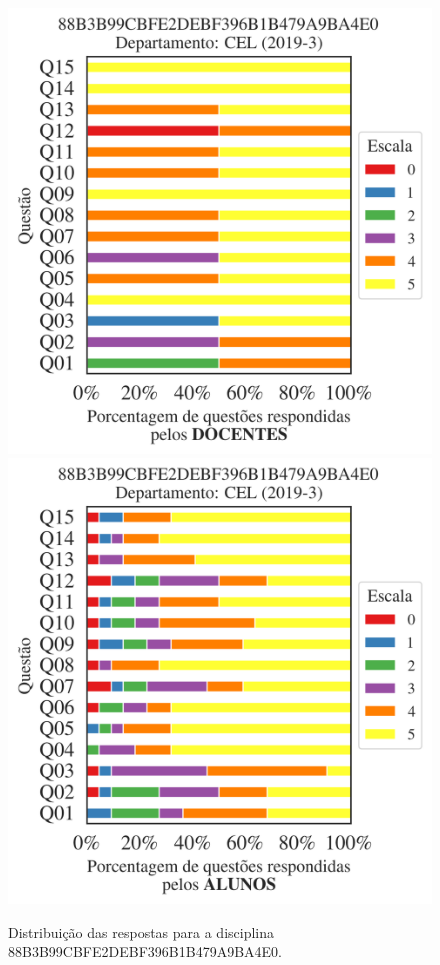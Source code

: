 \documentclass[a4paper,10pt]{article}
\begin{document}
\begin{figure}[h]
\centering
\includegraphics[width=0.485\linewidth]{analise_disciplina_departamento_CEL_88B3B99CBFE2DEBF396B1B479A9BA4E0_docentes.png}
\includegraphics[width=0.485\linewidth]{analise_disciplina_departamento_CEL_88B3B99CBFE2DEBF396B1B479A9BA4E0_alunos.png}
\caption{\label{fig:analise_geral_departamento}                Distribuição das respostas para a disciplina 88B3B99CBFE2DEBF396B1B479A9BA4E0. }
\end{figure}
\end{document}
